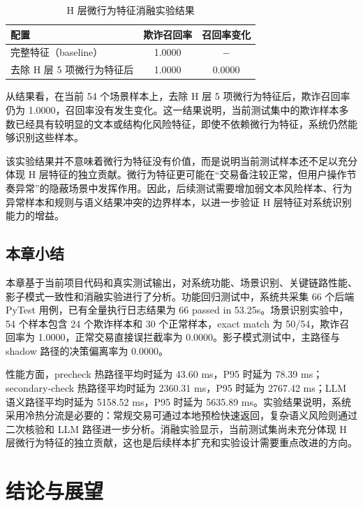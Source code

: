 \documentclass{xduugthesis}
\begin{document}
\begin{table}[H]
    \centering
    \caption{H 层微行为特征消融实验结果}
    \label{tab:h-layer-ablation}
    \begin{tabularx}{0.75\linewidth}{|Y|c|c|}
        \hline
        配置 & 欺诈召回率 & 召回率变化 \\
        \hline
        完整特征（baseline） & 1.0000 & $-$ \\
        \hline
        去除 H 层 5 项微行为特征后 & 1.0000 & 0.0000 \\
        \hline
    \end{tabularx}
\end{table}

从结果看，在当前 54 个场景样本上，去除 H 层 5 项微行为特征后，欺诈召回率仍为 1.0000，召回率没有发生变化。这一结果说明，当前测试集中的欺诈样本多数已经具有较明显的文本或结构化风险特征，即使不依赖微行为特征，系统仍然能够识别这些样本。

该实验结果并不意味着微行为特征没有价值，而是说明当前测试样本还不足以充分体现 H 层特征的独立贡献。微行为特征更可能在“交易备注较正常，但用户操作节奏异常”的隐蔽场景中发挥作用。因此，后续测试需要增加弱文本风险样本、行为异常样本和规则与语义结果冲突的边界样本，以进一步验证 H 层特征对系统识别能力的增益。

\section{本章小结}

本章基于当前项目代码和真实测试输出，对系统功能、场景识别、关键链路性能、影子模式一致性和消融实验进行了分析。功能回归测试中，系统共采集 66 个后端 PyTest 用例，已有全量执行日志结果为 66 passed in 53.25s。场景识别实验中，54 个样本包含 24 个欺诈样本和 30 个正常样本，exact match 为 50/54，欺诈召回率为 1.0000，正常交易直接误拦截率为 0.0000。影子模式测试中，主路径与 shadow 路径的决策偏离率为 0.0000。

性能方面，precheck 热路径平均时延为 43.60 ms，P95 时延为 78.39 ms；secondary-check 热路径平均时延为 2360.31 ms，P95 时延为 2767.42 ms；LLM 语义路径平均时延为 5158.52 ms，P95 时延为 5635.89 ms。实验结果说明，系统采用冷热分流是必要的：常规交易可通过本地预检快速返回，复杂语义风险则通过二次核验和 LLM 路径进一步分析。消融实验显示，当前测试集尚未充分体现 H 层微行为特征的独立贡献，这也是后续样本扩充和实验设计需要重点改进的方向。

\chapter{结论与展望}
\end{document}
